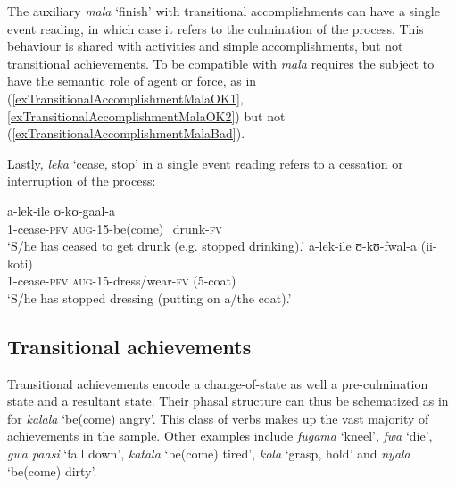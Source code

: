 The auxiliary \textit{mala} `finish' with transitional accomplishments can have a single event reading, in which case it refers to the culmination of the process. This behaviour is shared with activities and simple accomplishments, but not transitional achievements. To be compatible with \textit{mala} requires the subject to have the semantic role of agent or force, as in (\ref{exTransitionalAccomplishmentMalaOK1}, \ref{exTransitionalAccomplishmentMalaOK2}) but not (\ref{exTransitionalAccomplishmentMalaBad}).
\begin{exe}
\ex\begin{xlist}
\end{xlist}
\end{exe}

Lastly, \textit{leka} \lq cease, stop' in a single event reading refers to a cessation or interruption of the process:
\begin{exe}
\ex \begin{xlist}
\ex \gll a-lek-ile ʊ-kʊ-gaal-a\\
1-cease-\textsc{pfv} \textsc{aug}-15-be(come)\_drunk-\textsc{fv}\\
\glt `S/he has ceased to get drunk (e.g. stopped drinking).'
\ex \gll a-lek-ile ʊ-kʊ-fwal-a \textup{(}ii-koti\textup{)}\\
1-cease-\textsc{pfv} \textsc{aug}-15-dress/wear-\textsc{fv} (5-coat)\\
\glt `S/he has stopped dressing (putting on a/the coat).'
\end{xlist}
\end{exe}
\subsection{Transitional achievements}\label{VerbalClassTransitionalAchievement}
Transitional achievements encode a change-of-state as well a pre-culmination state and a resultant state. Their phasal structure can thus be schematized as in  for \textit{kalala} `be(come) angry'. This class of verbs makes up the vast majority of achievements in the sample. Other examples include \textit{fugama} \lq kneel', \textit{fwa} `die', \textit{gwa paasi} \lq fall down', \textit{katala} `be(come) tired', \textit{kola} \lq grasp, hold' and \textit{nyala} \lq be(come) dirty'.

